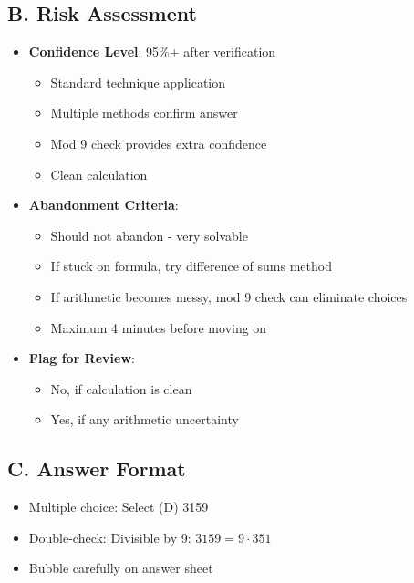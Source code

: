 \documentclass[12pt]{article}
\begin{document}
\begin{competitionbox}
\subsection*{B. Risk Assessment}
\begin{itemize}[leftmargin=*]
    \item \textbf{Confidence Level}: 95\%+ after verification
    \begin{itemize}
        \item Standard technique application
        \item Multiple methods confirm answer
        \item Mod 9 check provides extra confidence
        \item Clean calculation
    \end{itemize}
    \item \textbf{Abandonment Criteria}: 
    \begin{itemize}
        \item Should not abandon - very solvable
        \item If stuck on formula, try difference of sums method
        \item If arithmetic becomes messy, mod 9 check can eliminate choices
        \item Maximum 4 minutes before moving on
    \end{itemize}
    \item \textbf{Flag for Review}: 
    \begin{itemize}
        \item No, if calculation is clean
        \item Yes, if any arithmetic uncertainty
    \end{itemize}
\end{itemize}

\subsection*{C. Answer Format}
\begin{itemize}[leftmargin=*]
    \item Multiple choice: Select (D) 3159
    \item Double-check: Divisible by 9: $3159 = 9 \cdot 351$ \checkmark
    \item Bubble carefully on answer sheet
\end{itemize}
\end{competitionbox}
\end{document}
